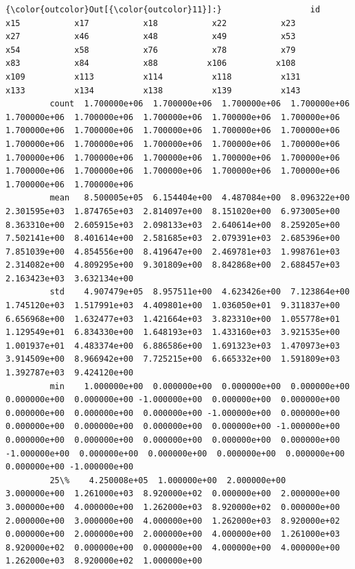 \documentclass[11pt]{article}
\begin{document}
\begin{Verbatim}[commandchars=\\\{\}]
{\color{outcolor}Out[{\color{outcolor}11}]:}                  id           x15           x17           x18           x22           x23           x27           x46           x48           x49           x53           x54           x58           x76           x78           x79           x83           x84           x88          x106          x108          x109          x113          x114          x118          x131          x133          x134          x138          x139          x143
         count  1.700000e+06  1.700000e+06  1.700000e+06  1.700000e+06  1.700000e+06  1.700000e+06  1.700000e+06  1.700000e+06  1.700000e+06  1.700000e+06  1.700000e+06  1.700000e+06  1.700000e+06  1.700000e+06  1.700000e+06  1.700000e+06  1.700000e+06  1.700000e+06  1.700000e+06  1.700000e+06  1.700000e+06  1.700000e+06  1.700000e+06  1.700000e+06  1.700000e+06  1.700000e+06  1.700000e+06  1.700000e+06  1.700000e+06  1.700000e+06  1.700000e+06
         mean   8.500005e+05  6.154404e+00  4.487084e+00  8.096322e+00  2.301595e+03  1.874765e+03  2.814097e+00  8.151020e+00  6.973005e+00  8.363310e+00  2.605915e+03  2.098133e+03  2.640614e+00  8.259205e+00  7.502141e+00  8.401614e+00  2.581685e+03  2.079391e+03  2.685396e+00  7.851039e+00  4.854556e+00  8.419647e+00  2.469781e+03  1.998761e+03  2.314082e+00  4.809295e+00  9.301809e+00  8.842868e+00  2.688457e+03  2.163423e+03  3.632134e+00
         std    4.907479e+05  8.957511e+00  4.623426e+00  7.123864e+00  1.745120e+03  1.517991e+03  4.409801e+00  1.036050e+01  9.311837e+00  6.656968e+00  1.632477e+03  1.421664e+03  3.823310e+00  1.055778e+01  1.129549e+01  6.834330e+00  1.648193e+03  1.433160e+03  3.921535e+00  1.001937e+01  4.483374e+00  6.886586e+00  1.691323e+03  1.470973e+03  3.914509e+00  8.966942e+00  7.725215e+00  6.665332e+00  1.591809e+03  1.392787e+03  9.424120e+00
         min    1.000000e+00  0.000000e+00  0.000000e+00  0.000000e+00  0.000000e+00  0.000000e+00 -1.000000e+00  0.000000e+00  0.000000e+00  0.000000e+00  0.000000e+00  0.000000e+00 -1.000000e+00  0.000000e+00  0.000000e+00  0.000000e+00  0.000000e+00  0.000000e+00 -1.000000e+00  0.000000e+00  0.000000e+00  0.000000e+00  0.000000e+00  0.000000e+00 -1.000000e+00  0.000000e+00  0.000000e+00  0.000000e+00  0.000000e+00  0.000000e+00 -1.000000e+00
         25\%    4.250008e+05  1.000000e+00  2.000000e+00  3.000000e+00  1.261000e+03  8.920000e+02  0.000000e+00  2.000000e+00  3.000000e+00  4.000000e+00  1.262000e+03  8.920000e+02  0.000000e+00  2.000000e+00  3.000000e+00  4.000000e+00  1.262000e+03  8.920000e+02  0.000000e+00  2.000000e+00  2.000000e+00  4.000000e+00  1.261000e+03  8.920000e+02  0.000000e+00  0.000000e+00  4.000000e+00  4.000000e+00  1.262000e+03  8.920000e+02  1.000000e+00

\end{Verbatim}
\end{document}
